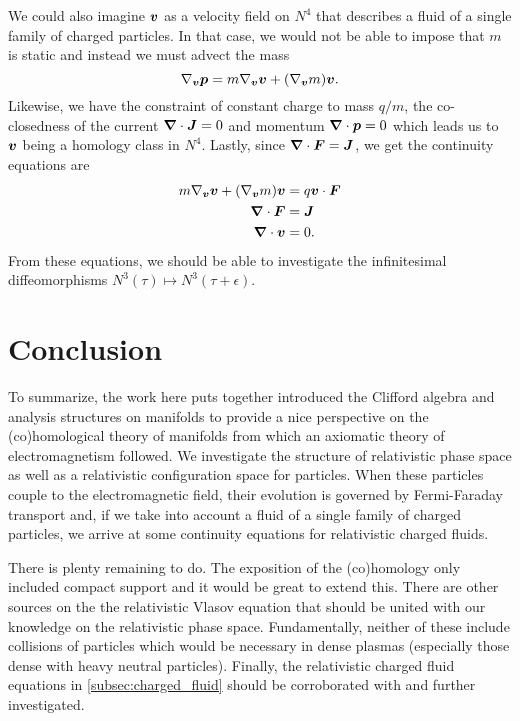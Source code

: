 \documentclass[conf]{new-aiaa}
\begin{document}
We could also imagine ${\boldsymbol{v}}$ as a velocity field on $N^4$ that describes a fluid of a single family of charged particles. In that case, we would not be able to impose that $m$ is static and instead we must advect the mass
\begin{equation}
   \nabla_{\boldsymbol{v}} \boldsymbol{p} = m \nabla_{\boldsymbol{v}} \boldsymbol{v} + (\nabla_{\boldsymbol{v}} m)\boldsymbol{v}.
\end{equation}
Likewise, we have the constraint of constant charge to mass $q/m$, the co-closedness of the current $\boldsymbol{\nabla} \cdot \boldsymbol{J}=0$ and momentum $\boldsymbol{\nabla} \cdot \boldsymbol{p}=0$ which leads us to $\boldsymbol{v}$ being a homology class in $N^4$. Lastly, since $\boldsymbol{\nabla} \cdot \boldsymbol{F} = \boldsymbol{J}$, we get the continuity equations are
\begin{align}
    m \nabla_{\boldsymbol{v}} \boldsymbol{v} + (\nabla_{\boldsymbol{v}} m)\boldsymbol{v} &= q \boldsymbol{v} \cdot \boldsymbol{F}\\
    \boldsymbol{\nabla} \cdot \boldsymbol{F} &= \boldsymbol{J}\\
    \boldsymbol{\nabla} \cdot \boldsymbol{v} &= 0.
\end{align}
From these equations, we should be able to investigate the infinitesimal diffeomorphisms $N^3(\tau)\mapsto N^3(\tau+\epsilon)$.

\section{Conclusion}

To summarize, the work here puts together introduced the Clifford algebra and analysis structures on manifolds to provide a nice perspective on the (co)homological theory of manifolds from which an axiomatic theory of electromagnetism followed. We investigate the structure of relativistic phase space as well as a relativistic configuration space for particles. When these particles couple to the electromagnetic field, their evolution is governed by Fermi-Faraday transport and, if we take into account a fluid of a single family of charged particles, we arrive at some continuity equations for relativistic charged fluids.

There is plenty remaining to do. The exposition of the (co)homology only included compact support and it would be great to extend this. There are other sources on the the relativistic Vlasov equation \cite{brizard_new_2000,marsden_hamiltonian_1982} that should be united with our knowledge on the relativistic phase space. Fundamentally, neither of these include collisions of particles which would be necessary in dense plasmas (especially those dense with heavy neutral particles). Finally, the relativistic charged fluid equations in \cref{subsec:charged_fluid} should be corroborated with \cite{pausader_relativistic_2013} and further investigated.
\end{document}
